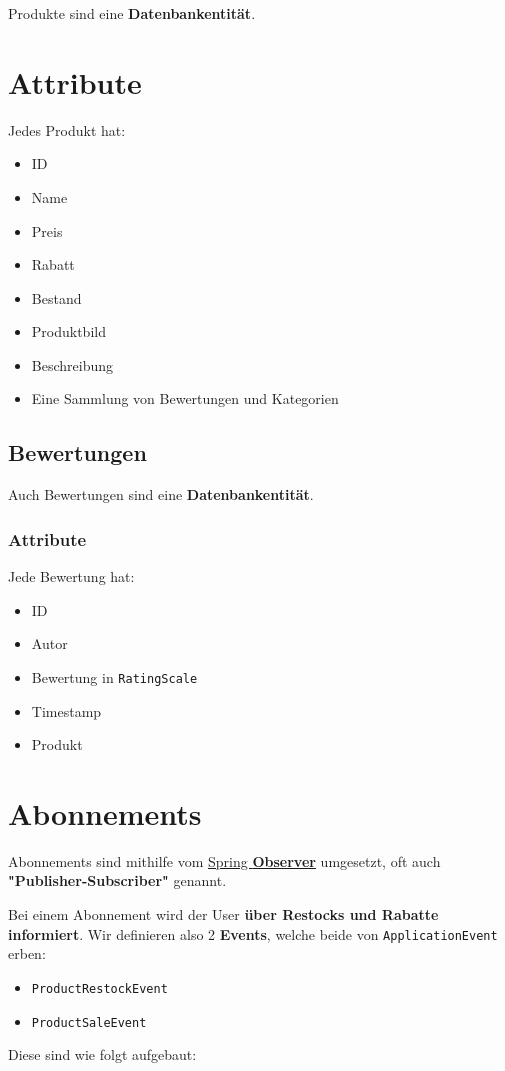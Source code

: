 \documentclass[12pt, a4paper]{scrreprt}
\begin{document}
	Produkte sind eine \textbf{Datenbankentität}.
	
		\section{Attribute}
		
		Jedes Produkt hat:
		\begin{itemize}
			\item ID
			\item Name
			\item Preis
			\item Rabatt
			\item Bestand
			\item Produktbild
			\item Beschreibung
			\item Eine Sammlung von Bewertungen und Kategorien
		\end{itemize}
	
			\subsection{Bewertungen}
			
			Auch Bewertungen sind eine \textbf{Datenbankentität}.
			
				\subsubsection{Attribute}
				
				Jede Bewertung hat:
				\begin{itemize}
					\item ID
					\item Autor
					\item Bewertung in \texttt{RatingScale}
					\item Timestamp
					\item Produkt
				\end{itemize}
		
		\section{Abonnements}
		
		Abonnements sind mithilfe vom \href{https://springframework.guru/gang-of-four-design-patterns/observer-pattern/}{Spring \textbf{Observer}} umgesetzt, oft auch \textbf{"Publisher-Subscriber"} genannt.
			
		Bei einem Abonnement wird der User \textbf{über Restocks und Rabatte informiert}. Wir definieren also 2 \textbf{Events}, welche beide von \texttt{ApplicationEvent} erben:
		\begin{itemize}
			\item \texttt{ProductRestockEvent}
			\item \texttt{ProductSaleEvent}
		\end{itemize}
		Diese sind wie folgt aufgebaut:
		
\end{document}
